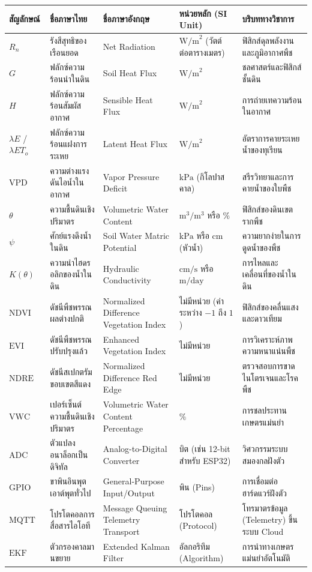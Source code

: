 \documentclass[11pt,a4paper,openany]{report}
\begin{document}
\begin{table}[htbp]
\centering
\begin{tabularx}{\textwidth}{L L L L L}
\toprule
สัญลักษณ์ & ชื่อภาษาไทย & ชื่อภาษาอังกฤษ & หน่วยหลัก (SI Unit) & บริบททางวิชาการ \\
\midrule
$R_n$ & รังสีสุทธิของเรือนยอด & Net Radiation & $\text{W/m}^2$ (วัตต์ต่อตารางเมตร) & ฟิสิกส์ดุลพลังงานและภูมิอากาศพืช \\
$G$ & ฟลักซ์ความร้อนนำในดิน & Soil Heat Flux & $\text{W/m}^2$ & ชลศาสตร์และฟิสิกส์ชั้นดิน \\
$H$ & ฟลักซ์ความร้อนสัมผัสอากาศ & Sensible Heat Flux & $\text{W/m}^2$ & การถ่ายเทความร้อนในอากาศ \\
$\lambda E$ / $\lambda ET_o$ & ฟลักซ์ความร้อนแฝงการระเหย & Latent Heat Flux & $\text{W/m}^2$ & อัตราการคายระเหยน้ำของทุเรียน \\
$\text{VPD}$ & ความต่างแรงดันไอน้ำในอากาศ & Vapor Pressure Deficit & $\text{kPa}$ (กิโลปาสคาล) & สรีรวิทยาและการคายน้ำของใบพืช \\
$\theta$ & ความชื้นดินเชิงปริมาตร & Volumetric Water Content & $\text{m}^3/\text{m}^3$ หรือ $\%$ & ฟิสิกส์ของดินเขตรากพืช \\
$\psi$ & ศักย์แรงดึงน้ำในดิน & Soil Water Matric Potential & $\text{kPa}$ หรือ $\text{cm}$ (หัวน้ำ) & ความยากง่ายในการดูดน้ำของพืช \\
$K(\theta)$ & ความนำไฮดรอลิกของน้ำในดิน & Hydraulic Conductivity & $\text{cm/s}$ หรือ $\text{m/day}$ & การไหลและเคลื่อนที่ของน้ำในดิน \\
$\text{NDVI}$ & ดัชนีพืชพรรณผลต่างปกติ & Normalized Difference Vegetation Index & ไม่มีหน่วย (ค่าระหว่าง $-1$ ถึง $1$) & ฟิสิกส์ของคลื่นแสงและดาวเทียม \\
$\text{EVI}$ & ดัชนีพืชพรรณปรับปรุงแล้ว & Enhanced Vegetation Index & ไม่มีหน่วย & การวิเคราะห์ภาพความหนาแน่นพืช \\
$\text{NDRE}$ & ดัชนีสเปกตรัมขอบเขตสีแดง & Normalized Difference Red Edge & ไม่มีหน่วย & ตรวจสอบการขาดไนโตรเจนและโรคพืช \\
$\text{VWC}$ & เปอร์เซ็นต์ความชื้นดินเชิงปริมาตร & Volumetric Water Content Percentage & $\%$ & การชลประทานเกษตรแม่นยำ \\
$\text{ADC}$ & ตัวแปลงอนาล็อกเป็นดิจิทัล & Analog-to-Digital Converter & บิต (เช่น 12-bit สำหรับ ESP32) & วิศวกรรมระบบสมองกลฝังตัว \\
$\text{GPIO}$ & ขาพินอินพุตเอาต์พุตทั่วไป & General-Purpose Input/Output & พิน (Pins) & การเชื่อมต่อฮาร์ดแวร์ฝังตัว \\
$\text{MQTT}$ & โปรโตคอลการสื่อสารไอโอที & Message Queuing Telemetry Transport & โปรโตคอล (Protocol) & โทรมาตรข้อมูล (Telemetry) ขึ้นระบบ Cloud \\
$\text{EKF}$ & ตัวกรองคาลมานขยาย & Extended Kalman Filter & อัลกอริทึม (Algorithm) & การนำทางเกษตรแม่นยำอัตโนมัติ \\
\bottomrule
\end{tabularx}
\end{table}
\end{document}
